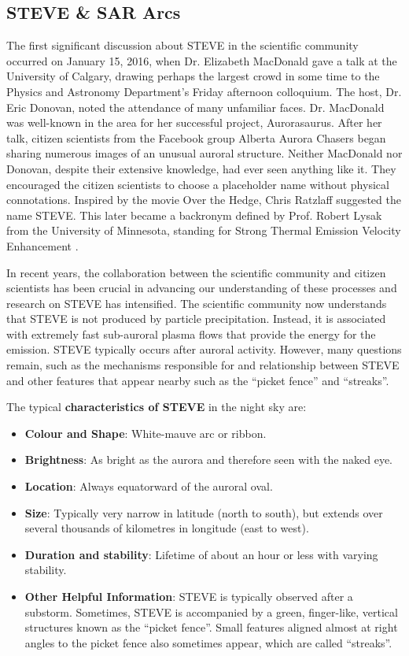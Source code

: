 \documentclass{article}
\renewcommand{\cite}[1]{\parencite{#1}}
\newcommand{\contributed}[1]{%
    \par\noindent
    \begingroup
    \setlength{\leftskip}{1em}%
    \itshape
    Contributors: #1
    \par
    \endgroup
    \vspace{0.5em}
}
\begin{document}
\subsection{STEVE \& SAR Arcs}\label{steve-sar-arcs}  
The first significant discussion about STEVE in the scientific community occurred on January 15, 2016, when Dr. Elizabeth MacDonald gave a talk at the University of Calgary, drawing perhaps the largest crowd in some time to the Physics and Astronomy Department's Friday afternoon colloquium. The host, Dr. Eric Donovan, noted the attendance of many unfamiliar faces. Dr. MacDonald was well-known in the area for her successful project, Aurorasaurus. After her talk, citizen scientists from the Facebook group Alberta Aurora Chasers began sharing numerous images of an unusual auroral structure. Neither MacDonald nor Donovan, despite their extensive knowledge, had ever seen anything like it. They encouraged the citizen scientists to choose a placeholder name without physical connotations. Inspired by the movie Over the Hedge, Chris Ratzlaff suggested the name STEVE. This later became a backronym defined by Prof. Robert Lysak from the University of Minnesota, standing for Strong Thermal Emission Velocity Enhancement \cite{Gallardolacourt_2019}.

In recent years, the collaboration between the scientific community and citizen scientists has been crucial in advancing our understanding of these processes and research on STEVE has intensified. The scientific community now understands that STEVE is not produced by particle precipitation. Instead, it is associated with extremely fast sub-auroral plasma flows that provide the energy for the emission. STEVE typically occurs after auroral activity. However, many questions remain, such as the mechanisms responsible for and relationship between STEVE and other features that appear nearby such as the ``picket fence'' and ``streaks''.

The typical {\bf characteristics of STEVE} in the night sky are:

\begin{itemize}
\item {\bf Colour and Shape}: White-mauve arc or ribbon. 
\item {\bf Brightness}: As bright as the aurora and therefore seen with the naked eye.
\item {\bf Location}: Always equatorward of the auroral oval. 
\item {\bf Size}: Typically very narrow in latitude (north to south), but extends over several thousands of kilometres in longitude (east to west).
\item {\bf Duration and stability}: Lifetime of about an hour or less with varying stability.
\item {\bf Other Helpful Information}: STEVE is typically observed after a substorm. Sometimes, STEVE is accompanied by a green, finger-like, vertical structures known as the ``picket fence''. Small features aligned almost at right angles to the picket fence also sometimes appear, which are called ``streaks''.
\end{itemize}
\end{document}

